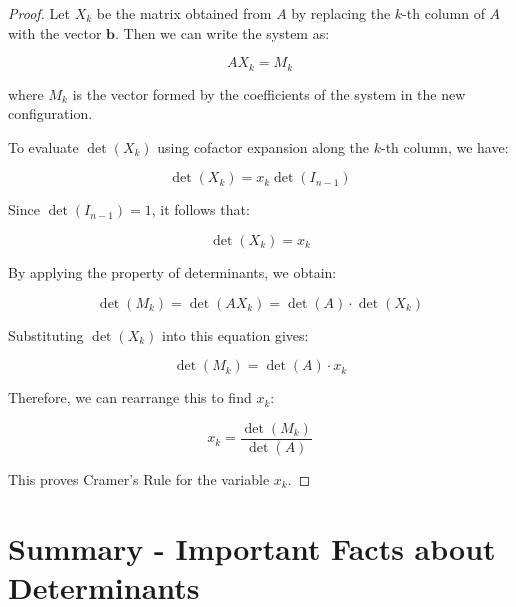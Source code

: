\documentclass[10pt, oneside]{article}
\begin{document}
\begin{proof}
	Let \( X_k \) be the matrix obtained from \( A \) by replacing the \( k \)-th column of \( A \) with the vector \( \mathbf{b} \). Then we can write the system as:

	\[
		A X_k = M_k
	\]

	where \( M_k \) is the vector formed by the coefficients of the system in the new configuration.

	To evaluate \( \det(X_k) \) using cofactor expansion along the \( k \)-th column, we have:

	\[
		\det(X_k) = x_k \det(I_{n-1})
	\]

	Since \( \det(I_{n-1}) = 1 \), it follows that:

	\[
		\det(X_k) = x_k
	\]

	By applying the property of determinants, we obtain:

	\[
		\det(M_k) = \det(A X_k) = \det(A) \cdot \det(X_k)
	\]

	Substituting \( \det(X_k) \) into this equation gives:

	\[
		\det(M_k) = \det(A) \cdot x_k
	\]

	Therefore, we can rearrange this to find \( x_k \):

	\[
		x_k = \frac{\det(M_k)}{\det(A)}
	\]

	This proves Cramer's Rule for the variable \( x_k \).
\end{proof}
\section{Summary - Important Facts about Determinants}
\end{document}
